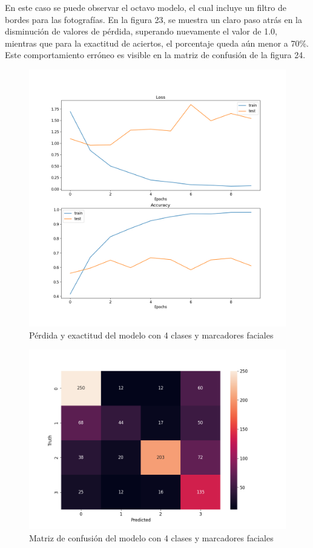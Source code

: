 En este caso se puede observar el octavo modelo, el cual incluye un filtro de bordes para las fotografías. En la figura 23, se muestra un claro paso atrás en la disminución de valores de pérdida, superando nuevamente el valor de 1.0, mientras que para la exactitud de aciertos, el porcentaje queda aún menor a 70\%. Este comportamiento erróneo es visible en la matriz de confusión de la figura 24.

\begin{figure}[H]
	\centering
	\includegraphics[scale=0.65]{figures/LA8.png}
	\caption{Pérdida y exactitud del modelo con 4 clases y marcadores faciales}
	\label{fig:img25}
\end{figure}

\begin{figure}[H]
	\centering
	\includegraphics[scale=0.75]{figures/CM8.png}
	\caption{Matriz de confusión del modelo con 4 clases y marcadores faciales}
	\label{fig:img26}
\end{figure}

